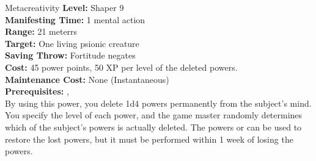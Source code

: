 {Metacreativity}
{
	\textbf{Level:}
	Shaper 9\\
	\textbf{Manifesting Time:}
	1 mental action\\
	\textbf{Range:}
	21 meterrs\\
	\textbf{Target:}
	One living psionic creature\\
	\textbf{Saving Throw:}
	Fortitude negates\\
	\textbf{Cost:}
	45 power points, 50 XP per level of the deleted powers.\\
	\textbf{Maintenance Cost:}
	None (Instantaneous)\\
	\textbf{Prerequisites:}
	, \\
}
{
	By using this power, you delete 1d4 powers permanently from the subject's mind. You specify the level of each power, and the game master randomly determines which of the subject's powers is actually deleted. The powers  or  can be used to restore the lost powers, but it must be performed within 1 week of losing the powers.
}